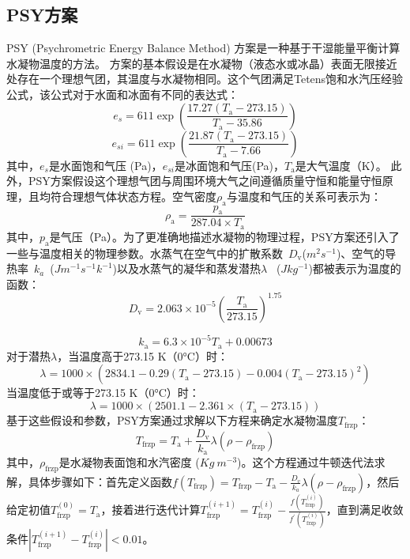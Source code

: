 \subsection{PSY方案}
PSY (Psychrometric Energy Balance Method) 方案是一种基于干湿能量平衡计算水凝物温度的方法。
方案的基本假设是在水凝物（液态水或冰晶）表面无限接近处存在一个理想气团，其温度与水凝物相同。这个气团满足Tetens饱和水汽压经验公式，该公式对于水面和冰面有不同的表达式：
\begin{equation}
e_s = 611 \exp\left(\frac{17.27(T_{\mathrm{a}} - 273.15)}{T_{\mathrm{a}} - 35.86}\right)
\end{equation}
\begin{equation}
e_{si} = 611 \exp\left(\frac{21.87(T_{\mathrm{a}} - 273.15)}{T_{\mathrm{a}} - 7.66}\right)
\end{equation}
其中，$e_s$是水面饱和气压 (Pa)，$e_{si}$是冰面饱和气压(Pa)，$T_{\mathrm{a}}$是大气温度（K）。 此外，PSY方案假设这个理想气团与周围环境大气之间遵循质量守恒和能量守恒原理，且均符合理想气体状态方程。空气密度$\rho_{\mathrm{a}}$与温度和气压的关系可表示为：
\begin{equation}
\rho_{\mathrm{a}} = \frac{p_{\mathrm{a}}}{287.04 \times T_{\mathrm{a}} }
\end{equation}
其中，$p_{\mathrm{a}}$是气压（Pa）。为了更准确地描述水凝物的物理过程，PSY方案还引入了一些与温度相关的物理参数。水蒸气在空气中的扩散系数~$D_\mathrm{v}$($\unit{m^2 s^{-1}}$)、空气的导热率~$k_a$~($\unit{J m^{-1} s^{-1} k^{-1}}$)以及水蒸气的凝华和蒸发潜热$\lambda$ ~($\unit{J kg^{-1}}$)都被表示为温度的函数：
\begin{equation}
D_\mathrm{v}= 2.063 \times 10^{-5} \left(\frac{T_{\mathrm{a}}}{273.15}\right)^{1.75}
\end{equation}

\begin{equation}
k_{\mathrm{a}} = 6.3 \times 10^{-5} T_{\mathrm{a}} + 0.00673
\end{equation}
对于潜热$\lambda$，当温度高于273.15 K（0°C）时：
\begin{equation}
\lambda = 1000\times(2834.1 - 0.29(T_{\mathrm{a}}-273.15) - 0.004(T_{\mathrm{a}}-273.15)^2)
\end{equation}
当温度低于或等于273.15 K（0°C）时：
\begin{equation}
\lambda = 1000\times(2501.1 - 2.361\times(T_{\mathrm{a}}-273.15))
\end{equation}
基于这些假设和参数，PSY方案通过求解以下方程来确定水凝物温度$T_{\mathrm{frzp}}$：
\begin{equation}
\label{eq:水凝物表面空气温度定义}
T_{\mathrm{frzp}} = T_{\mathrm{a}} + \frac{D_{\mathrm{v}}}{k_{\mathrm{a}}} \lambda (\rho - \rho_{\mathrm{frzp}})
\end{equation}
其中，$\rho_{\mathrm{frzp}}$是水凝物表面饱和水汽密度 ($\unit{Kg~m^{-3}}$)。这个方程通过牛顿迭代法求解，具体步骤如下：首先定义函数$f(T_{\mathrm{frzp}}) = T_{\mathrm{frzp}} - T_{\mathrm{a}} - \frac{D_v}{k_a} \lambda (\rho - \rho_{\mathrm {frzp}})$，然后给定初值$T_{\mathrm{frzp}}^{(0)} = T_{\mathrm{a}}$，接着进行迭代计算$T_{\mathrm {frzp}}^{(i+1)} = T_{\mathrm {frzp}}^{(i)} - \frac{f(T_{\mathrm {frzp}}^{(i)})}{f^{'}(T_{\mathrm {frzp}}^{(i)})}$，直到满足收敛条件$|T_{\mathrm {frzp}}^{(i+1)} - T_{\mathrm {frzp}}^{(i)}| < 0.01$。

